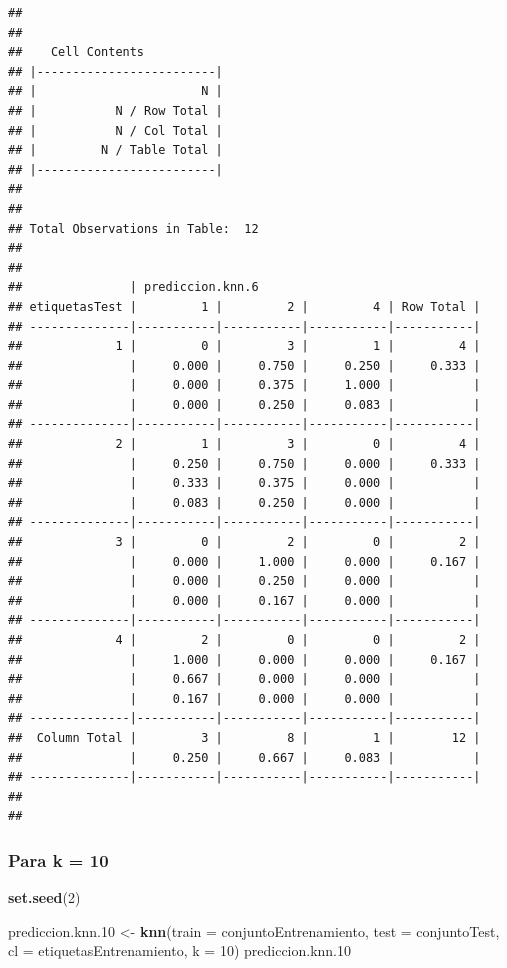 \documentclass[]{article}
\newenvironment{Shaded}{\begin{snugshade}}{\end{snugshade}}
\newcommand{\KeywordTok}[1]{\textcolor[rgb]{0.13,0.29,0.53}{\textbf{#1}}}
\newcommand{\DataTypeTok}[1]{\textcolor[rgb]{0.13,0.29,0.53}{#1}}
\newcommand{\DecValTok}[1]{\textcolor[rgb]{0.00,0.00,0.81}{#1}}
\newcommand{\StringTok}[1]{\textcolor[rgb]{0.31,0.60,0.02}{#1}}
\newcommand{\NormalTok}[1]{#1}
\begin{document}
\begin{verbatim}
## 
##  
##    Cell Contents
## |-------------------------|
## |                       N |
## |           N / Row Total |
## |           N / Col Total |
## |         N / Table Total |
## |-------------------------|
## 
##  
## Total Observations in Table:  12 
## 
##  
##               | prediccion.knn.6 
## etiquetasTest |         1 |         2 |         4 | Row Total | 
## --------------|-----------|-----------|-----------|-----------|
##             1 |         0 |         3 |         1 |         4 | 
##               |     0.000 |     0.750 |     0.250 |     0.333 | 
##               |     0.000 |     0.375 |     1.000 |           | 
##               |     0.000 |     0.250 |     0.083 |           | 
## --------------|-----------|-----------|-----------|-----------|
##             2 |         1 |         3 |         0 |         4 | 
##               |     0.250 |     0.750 |     0.000 |     0.333 | 
##               |     0.333 |     0.375 |     0.000 |           | 
##               |     0.083 |     0.250 |     0.000 |           | 
## --------------|-----------|-----------|-----------|-----------|
##             3 |         0 |         2 |         0 |         2 | 
##               |     0.000 |     1.000 |     0.000 |     0.167 | 
##               |     0.000 |     0.250 |     0.000 |           | 
##               |     0.000 |     0.167 |     0.000 |           | 
## --------------|-----------|-----------|-----------|-----------|
##             4 |         2 |         0 |         0 |         2 | 
##               |     1.000 |     0.000 |     0.000 |     0.167 | 
##               |     0.667 |     0.000 |     0.000 |           | 
##               |     0.167 |     0.000 |     0.000 |           | 
## --------------|-----------|-----------|-----------|-----------|
##  Column Total |         3 |         8 |         1 |        12 | 
##               |     0.250 |     0.667 |     0.083 |           | 
## --------------|-----------|-----------|-----------|-----------|
## 
## 
\end{verbatim}

\subsubsection{Para k = 10}\label{para-k-10}

\begin{Shaded}
\begin{Highlighting}[]
\KeywordTok{set.seed}\NormalTok{(}\DecValTok{2}\NormalTok{)}

\NormalTok{prediccion.knn.}\DecValTok{10}\NormalTok{ <-}\StringTok{ }\KeywordTok{knn}\NormalTok{(}\DataTypeTok{train =}\NormalTok{ conjuntoEntrenamiento, }\DataTypeTok{test =}\NormalTok{ conjuntoTest, }\DataTypeTok{cl =}\NormalTok{ etiquetasEntrenamiento, }\DataTypeTok{k =} \DecValTok{10}\NormalTok{)}
\NormalTok{prediccion.knn.}\DecValTok{10}
\end{Highlighting}
\end{Shaded}
\end{document}
